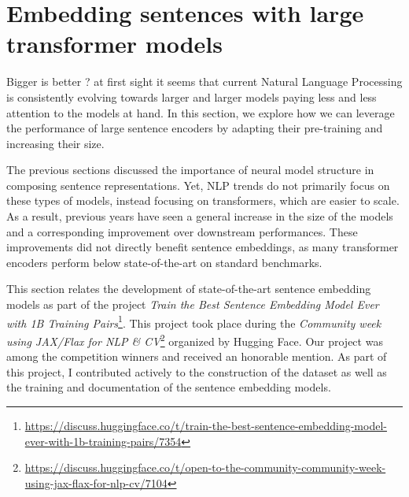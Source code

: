 \setchapterpreamble[u]{\margintoc}
\chapter{Embedding sentences with large transformer models}



Bigger is better ? at first sight it seems that current Natural Language Processing is consistently evolving towards larger and larger models paying less and less attention to the models at hand. In this section, we explore how we can leverage the performance of large sentence encoders by adapting their pre-training and increasing their size.

The previous sections discussed the importance of neural model structure in composing sentence representations. Yet, NLP trends do not primarily focus on these types of models, instead focusing on transformers, which are easier to scale. As a result, previous years have seen a general increase in the size of the models and a corresponding improvement over downstream performances. These improvements did not directly benefit sentence embeddings, as many transformer encoders perform below state-of-the-art on standard benchmarks. 

This section relates the development of state-of-the-art sentence embedding models as part of the project \textit{Train the Best Sentence Embedding Model Ever with 1B Training Pairs}\footnote{\url{https://discuss.huggingface.co/t/train-the-best-sentence-embedding-model-ever-with-1b-training-pairs/7354}}. This project took place during the \textit{Community week using JAX/Flax for NLP \& CV}\footnote{\url{https://discuss.huggingface.co/t/open-to-the-community-community-week-using-jax-flax-for-nlp-cv/7104}} organized by Hugging Face. Our project was among the competition winners and received an honorable mention. As part of this project, I contributed actively to the construction of the dataset as well as the training and documentation of the sentence embedding models.

